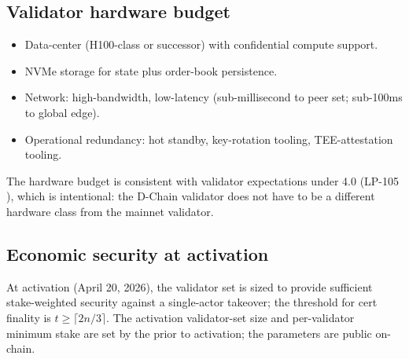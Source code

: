 \subsection{Validator hardware budget}

\begin{itemize}[leftmargin=1.2em]
  \item Data-center \GPU{} (H100-class or successor) with
        confidential compute support.
  \item NVMe storage for state plus order-book persistence.
  \item Network: high-bandwidth, low-latency (sub-millisecond to
        peer set; sub-100ms to global edge).
  \item Operational redundancy: hot standby, key-rotation tooling,
        TEE-attestation tooling.
\end{itemize}

The hardware budget is consistent with \Lux{} validator
expectations under \Quasar{} 4.0 (LP-105 \cite{lp-105}), which
is intentional: the \Zoo{} D-Chain validator does not have to be
a different hardware class from the \Lux{} mainnet validator.

\subsection{Economic security at activation}

At activation (April 20, 2026), the validator set is sized to
provide sufficient stake-weighted security against a single-actor
takeover; the threshold for cert finality is $t \geq \lceil 2n/3
\rceil$. The activation validator-set size and per-validator
minimum stake are set by the \Zoo{} \DAO{} prior to activation;
the parameters are public on-chain.
